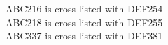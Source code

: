 ABC216 is cross listed with DEF254 \\
ABC218 is cross listed with DEF255 \\
ABC337 is cross listed with DEF381 \\
